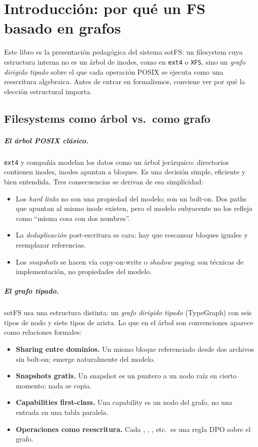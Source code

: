 \chapter{Introducción: por qué un FS basado en grafos}
\label{cap:intro}

Este libro es la presentación pedagógica del sistema sotFS: un
filesystem cuya estructura interna no es un árbol de inodes, como en
\texttt{ext4} o \texttt{XFS}, sino un \emph{grafo dirigido tipado} sobre
el que cada operación POSIX se ejecuta como una reescritura algebraica.
Antes de entrar en formalismos, conviene ver por qué la elección
estructural importa.

\section{Filesystems como árbol vs.\ como grafo}

\paragraph{El árbol POSIX clásico.} \texttt{ext4} y compañía modelan los
datos como un árbol jerárquico: directorios contienen inodes, inodes
apuntan a bloques. Es una decisión simple, eficiente y bien entendida.
Tres consecuencias se derivan de esa simplicidad:

\begin{itemize}
  \item Los \emph{hard links} no son una propiedad del modelo; son un
    bolt-on. Dos paths que apuntan al mismo inode existen, pero el modelo
    subyacente no los refleja como ``misma cosa con dos nombres''.
  \item La \emph{deduplicación} post-escritura es cara: hay que rescanear
    bloques iguales y reemplazar referencias.
  \item Los \emph{snapshots} se hacen vía copy-on-write o
    \emph{shadow paging}; son técnicas de implementación, no propiedades
    del modelo.
\end{itemize}

\paragraph{El grafo tipado.} sotFS usa una estructura distinta: un
\emph{grafo dirigido tipado} (TypeGraph) con seis tipos de nodo y siete
tipos de arista. Lo que en el árbol son convenciones aparece como
relaciones formales:

\begin{itemize}
  \item \textbf{Sharing entre dominios.} Un mismo bloque referenciado
    desde dos archivos sin bolt-on; emerge naturalmente del modelo.
  \item \textbf{Snapshots gratis.} Un snapshot es un puntero a un nodo
    raíz en cierto momento; nada se copia.
  \item \textbf{Capabilities first-class.} Una capability es un nodo del
    grafo, no una entrada en una tabla paralela.
  \item \textbf{Operaciones como reescritura.} Cada \opcreate, \opmkdir,
    \opunlink, etc.\ es una regla DPO sobre el grafo.
\end{itemize}

